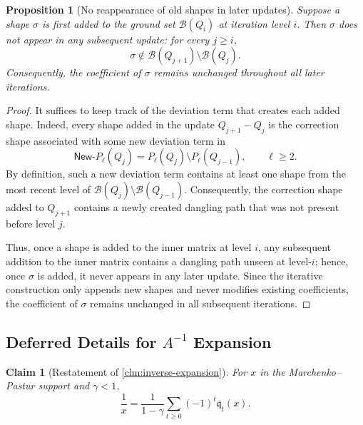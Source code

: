 \documentclass[12pt]{article}
\newtheorem{claim}[theorem]{Claim}
\newtheorem{proposition}[theorem]{Proposition}
\newcommand{\calB}{\mathcal{B}}
\newcommand{\q}{\mathfrak q}
\begin{document}

\begin{proposition}[No reappearance of old shapes in later updates]
\label{prop:no-reappearance-old-shapes}
Suppose a shape \(\sigma\) is first added to the ground set \(\calB(Q_i)\) at
iteration level \(i\). Then \(\sigma\) does not appear in any subsequent update:
for every \(j\ge i\),
\[
    \sigma \notin \calB(Q_{j+1})\setminus \calB(Q_j).
\]
Consequently, the coefficient of \(\sigma\) remains unchanged throughout all
later iterations.
\end{proposition}

\begin{proof}
It suffices to keep track of the deviation term that creates each added shape.
Indeed, every shape added in the update \(Q_{j+1}-Q_j\) is the correction shape
associated with some new deviation term in
\[
    \textsf{New}\text{-}P_\ell(Q_j)
    =
    P_\ell(Q_j)\setminus P_\ell(Q_{j-1}),
    \qquad \ell\ge 2.
\]
By definition, such a new deviation term contains at least one shape from the
most recent level of \(
    \calB(Q_j)\setminus \calB(Q_{j-1}).
\)
Consequently, the correction shape added to \(Q_{j+1}\) contains a newly created
dangling path that was not present before level \(j\).

Thus, once a shape is added to the inner matrix at level $i$, any subsequent addition to the inner matrix contains a dangling path unseen at level-$i$; hence, once \(\sigma\) is added, it never appears in any later update. Since the
iterative construction only appends new shapes and never modifies existing
coefficients, the coefficient of \(\sigma\) remains unchanged in all subsequent
iterations.
\end{proof}



\subsection{Deferred Details for $A^{-1}$ Expansion}
\begin{claim}[Restatement of \cref{clm:inverse-expansion}]
For \(x\) in the Marchenko--Pastur support and \(\gamma<1\),
\[
    \frac{1}{x}
    =
    \frac{1}{1-\gamma}
    \sum_{t\geq 0} (-1)^t \q_t(x).
\]
\end{claim}
\end{document}
